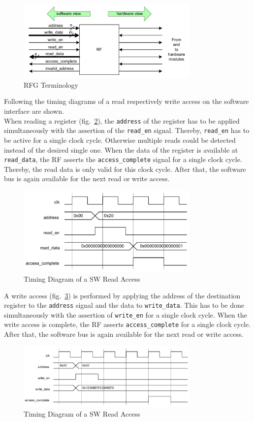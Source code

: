 \begin{figure}[h]
 \centering
 \includegraphics[width=252pt]{images/rf_view.png}
 \caption{RFG Terminology \cite{leber_diss}}
\label{fig::rfg_view}
\end{figure}
Following the timing diagrams of a read respectively write access on the software interface are shown.\\
When reading a register (fig.~\ref{fig::sw_read}), the \lstinline$address$ of the register has to be applied simultaneously with the assertion of the \lstinline$read_en$ signal. Thereby, \lstinline$read_en$ has to be active for a single clock cycle. Otherwise multiple reads could be detected instead of the desired single one. When the data of the register is available at \lstinline$read_data$, the RF asserts the \lstinline$access_complete$ signal for a single clock cycle. Thereby, the read data is only valid for this clock cycle. After that, the software bus is again available for the next read or write access.\\
\begin{figure}[h]
 \centering
 \includegraphics[width=252pt]{images/sw_read_timing.png}
 \caption{Timing Diagram of a SW Read Access \cite{leber_diss}}
\label{fig::sw_read}
\end{figure}
A write access (fig.~\ref{fig::sw_write}) is performed by applying the address of the destination register to the \lstinline$address$ signal and the data to \lstinline$write_data$. This has to be done simultaneously with the assertion of \lstinline$write_en$ for a single clock cycle. When the write access is complete, the RF asserts \lstinline$access_complete$ for a single clock cycle. After that, the software bus is again available for the next read or write access.
\begin{figure}[h]
 \centering
 \includegraphics[width=252pt]{images/sw_write_timing.png}
 \caption{Timing Diagram of a SW Read Access \cite{leber_diss}}
\label{fig::sw_write}
\end{figure}


